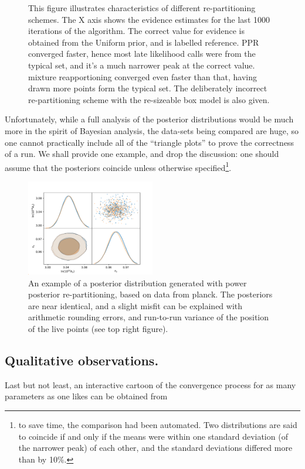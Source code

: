 \documentclass[usenatbib]{mnras}
\begin{document}
\begin{figure}

\caption{\label{orgb8afdfc}
This figure illustrates characteristics of different re-partitioning schemes. The X axis shows the evidence estimates for the last 1000 iterations of the algorithm. The correct value for evidence is obtained from the Uniform prior, and is labelled reference. PPR converged faster, hence most late likelihood calls were from the typical set, and it's a much narrower peak at the correct value. mixture reapportioning converged even faster than that, having drawn more points form the typical set. The deliberately incorrect re-partitioning scheme with the re-sizeable box model is also given.}
\end{figure}

Unfortunately, while a full analysis of the posterior distributions
would be much more in the spirit of Bayesian analysis, the data-sets
being compared are huge, so one cannot practically include all of
the ``triangle plots'' to prove the correctness of a run. We shall
provide one example, and drop the discussion: one should assume
that the posteriors coincide unless otherwise specified\footnote{to save time, the comparison had been automated. Two distributions are said to coincide if and only if the means were within one standard deviation (of the narrower peak) of each other, and the standard deviations differed more than by 10\%.}. 

\begin{figure}
 \includegraphics[width=0.5\textwidth]{./illustrations/misfit.pdf}
\caption{\label{org69e9878}
An example of a posterior distribution generated with power posterior re-partitioning, based on data from planck. The posteriors are near identical, and a slight misfit can be explained with arithmetic rounding errors, and run-to-run variance of the position of the live points (see top right figure).}
\end{figure}




\subsection{Qualitative observations.}
\label{sec:org8022886}
Last but not least, an interactive cartoon of the convergence
process for as many parameters as one likes can be obtained from
\end{document}
